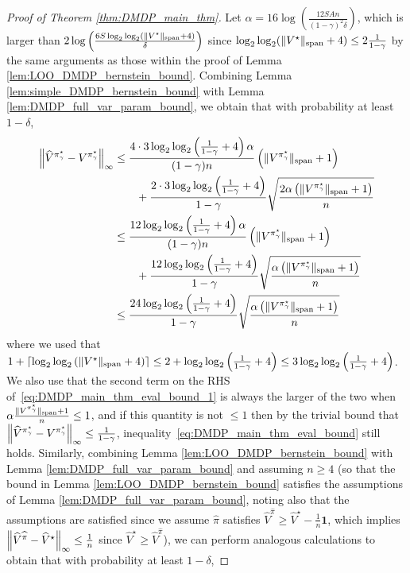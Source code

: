 \documentclass{article}
\theoremstyle{plain}
\theoremstyle{plain}
\theoremstyle{remark}
\theoremstyle{plain}
\theoremstyle{plain}
\newcommand{\Vhat}{\widehat{V}}
\newcommand{\pistar}{\pi^\star}
\newcommand{\one}{\mathbf{1}}
\newcommand{\pihat}{\widehat{\pi}}
\newcommand{\Vhatstar}{\widehat{V}^\star}
\begin{document}
\begin{proof}[Proof of Theorem \ref{thm:DMDP_main_thm}]
    Let $\alpha = 16 \log \left(\frac{12 SA n}{(1-\gamma)^2\delta}  \right)$, which is larger than $2 \log \left( \frac{6 S \log_2 \log_2 \left(\Vert V^\star\Vert _{\textnormal{span}}+4 \right)}{\delta} \right)$ since $\log_2 \log_2 (\Vert V^\star\Vert _{\textnormal{span}}+4) \leq 2\frac{1}{1-\gamma}$ by the same arguments as those within the proof of Lemma \ref{lem:LOO_DMDP_bernstein_bound}. Combining Lemma \ref{lem:simple_DMDP_bernstein_bound} with Lemma \ref{lem:DMDP_full_var_param_bound}, we obtain that with probability at least $1 - \delta$,
    \begin{align}
        \infnorm{ \Vhat^{\pistar_\gamma} - V^{\pistar_\gamma}} &\leq \frac{4 \cdot 3 \log_2 \log_2 \left( \frac{1}{1-\gamma} + 4\right) \alpha}{(1-\gamma)n} \left( \spannorm{V^{\pistar_\gamma}} + 1\right) \nonumber\\
        & \quad \quad  + \frac{2 \cdot 3 \log_2 \log_2 \left( \frac{1}{1-\gamma} + 4\right)}{1-\gamma} \sqrt{\frac{2 \alpha \left( \spannorm{V^{\pistar_\gamma}} + 1\right)}{n}} \nonumber\\
        &\leq \frac{12 \log_2 \log_2 \left( \frac{1}{1-\gamma} + 4\right) \alpha}{(1-\gamma)n} \left( \spannorm{V^{\pistar_\gamma}} + 1\right) \nonumber\\
        & \quad \quad  + \frac{12 \log_2 \log_2 \left( \frac{1}{1-\gamma} + 4\right) }{1-\gamma} \sqrt{\frac{ \alpha \left( \spannorm{V^{\pistar_\gamma}} + 1\right)}{n}} \label{eq:DMDP_main_thm_eval_bound_1}\\
        & \leq \frac{24 \log_2 \log_2 \left( \frac{1}{1-\gamma} + 4\right)  }{1-\gamma}\sqrt{\frac{ \alpha \left( \spannorm{V^{\pistar_\gamma}} + 1\right)}{n}}\label{eq:DMDP_main_thm_eval_bound}
    \end{align}
    where we used that $1+\left\lceil\log_2 \log_2 \left( \Vert V^\star\Vert _{\textnormal{span}} + 4\right) \right\rceil \leq 2 + \log_2 \log_2 \left( \frac{1}{1-\gamma} + 4\right) \leq 3 \log_2 \log_2 \left( \frac{1}{1-\gamma} + 4\right)$. We also use that the second term on the RHS of~\eqref{eq:DMDP_main_thm_eval_bound_1} is always the larger of the two when $\alpha\frac{\spannorm{V^{\pistar_\gamma}} + 1 }{n} \leq 1$, and if this quantity is not $\leq 1$ then by the trivial bound that $\infnorm{ \Vhat^{\pistar_\gamma} - V^{\pistar_\gamma}} \leq \frac{1}{1-\gamma}$, inequality~\eqref{eq:DMDP_main_thm_eval_bound} still holds.
    Similarly, combining Lemma \ref{lem:LOO_DMDP_bernstein_bound} with Lemma \ref{lem:DMDP_full_var_param_bound} and assuming $n \geq 4$ (so that the bound in Lemma \ref{lem:LOO_DMDP_bernstein_bound} satisfies the assumptions of Lemma \ref{lem:DMDP_full_var_param_bound}, noting also that the assumptions are satisfied since we assume $\pihat$ satisfies $\Vhat^{\pihat} \geq \Vhat^\star - \frac{1}{n}\one$, which implies $\infnorm{\Vhat^{\pihat} - \Vhatstar} \leq \frac{1}{n}$ since $\Vhatstar \geq \Vhat^{\pihat}$), we can perform analogous calculations to obtain that with probability at least $1 - \delta$,

\end{proof}
\end{document}
